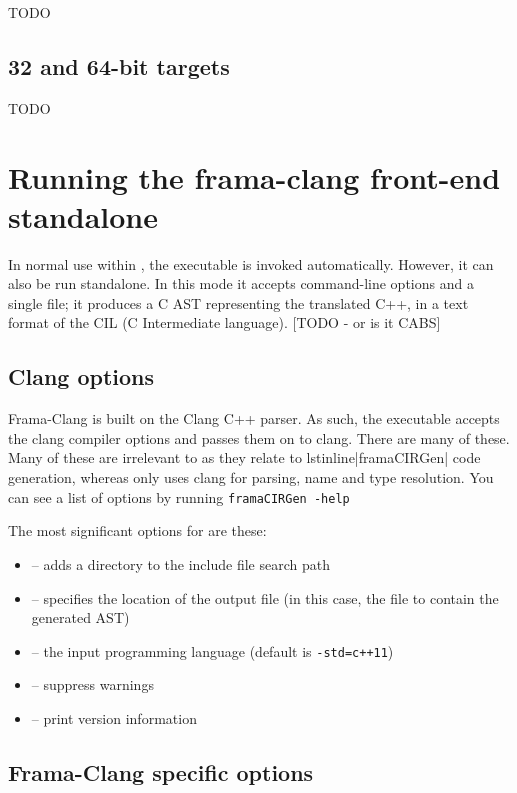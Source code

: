 TODO

\section{32 and 64-bit targets}

TODO


\chapter{Running the frama-clang front-end standalone}

In normal use within \fc, the \irg executable is
invoked automatically. However, it can also be run standalone.
In this mode it accepts command-line options and a single file;
it produces a C AST representing the translated C++, in a text format 
of the CIL (C Intermediate language). [TODO - or is it CABS]

\section{Clang options}

Frama-Clang is built on the Clang C++ parser. 
As such, the \irg executable accepts the clang
compiler options and passes them on to clang. There are many of these.
Many of these are irrelevant to \fcl as they relate to lstinline|framaCIRGen|
code generation, whereas \fcl only uses clang for parsing, name
and type resolution.
You can see a list of options by running 
\lstinline|framaCIRGen -help|

The most significant options for  \irg are these:
\begin{itemize}
	\item {} -- adds a directory to the include file search path
	\item {} -- specifies the location of the output file (in this case, the file to contain the generated AST)
	\item {} -- the input programming language (default is \lstinline|-std=c++11|)
	\item {} -- suppress warnings
	\item {} -- print version information
\end{itemize}

\section{Frama-Clang specific options}

